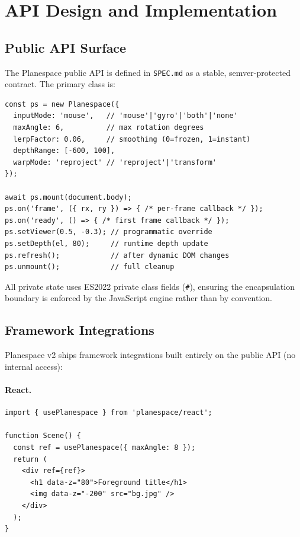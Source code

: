 \documentclass[10pt,twocolumn]{article}
\begin{document}
\section{API Design and Implementation}
\label{sec:api}

\subsection{Public API Surface}

The Planespace public API is defined in \texttt{SPEC.md} as a stable,
semver-protected contract. The primary class is:

\begin{lstlisting}[style=js,caption={Planespace constructor and key methods.},numbers=none]
const ps = new Planespace({
  inputMode: 'mouse',   // 'mouse'|'gyro'|'both'|'none'
  maxAngle: 6,          // max rotation degrees
  lerpFactor: 0.06,     // smoothing (0=frozen, 1=instant)
  depthRange: [-600, 100],
  warpMode: 'reproject' // 'reproject'|'transform'
});

await ps.mount(document.body);
ps.on('frame', ({ rx, ry }) => { /* per-frame callback */ });
ps.on('ready', () => { /* first frame callback */ });
ps.setViewer(0.5, -0.3); // programmatic override
ps.setDepth(el, 80);     // runtime depth update
ps.refresh();            // after dynamic DOM changes
ps.unmount();            // full cleanup
\end{lstlisting}

All private state uses ES2022 private class fields (\texttt{\#}), ensuring
the encapsulation boundary is enforced by the JavaScript engine rather than
by convention.

\subsection{Framework Integrations}

Planespace v2 ships framework integrations built entirely on the public API
(no internal access):

\paragraph{React.}
\begin{lstlisting}[style=js,caption={React hook usage.},numbers=none]
import { usePlanespace } from 'planespace/react';

function Scene() {
  const ref = usePlanespace({ maxAngle: 8 });
  return (
    <div ref={ref}>
      <h1 data-z="80">Foreground title</h1>
      <img data-z="-200" src="bg.jpg" />
    </div>
  );
}
\end{lstlisting}
\end{document}
